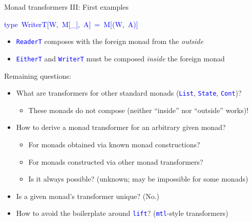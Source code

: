 \documentclass[english]{beamer}
\newenvironment{lyxcode}
  {\par\begin{list}{}{
    \setlength{\rightmargin}{\leftmargin}
    \setlength{\listparindent}{0pt}%
    \raggedright
    \setlength{\itemsep}{0pt}
    \setlength{\parsep}{0pt}
    \normalfont\ttfamily}%
   \def\{{\char`\{}
   \def\}{\char`\}}
   \def\textasciitilde{\char`\~}
   \item[]}
  {\end{list}}
\begin{document}
\begin{frame}{Monad transformers III: First examples}
\begin{lyxcode}
\textcolor{blue}{\footnotesize{}type~WriterT{[}W,~M{[}\_{]},~A{]}~=~M{[}(W,~A){]}}{\footnotesize\par}
\end{lyxcode}
\begin{itemize}
\item {\footnotesize{}\vspace{-0.2cm}}\texttt{\textcolor{blue}{\footnotesize{}ReaderT}}
composes with the foreign monad from the \emph{outside}
\item \texttt{\textcolor{blue}{\footnotesize{}EitherT}} and \texttt{\textcolor{blue}{\footnotesize{}WriterT}}
must be composed \emph{inside} the foreign monad
\end{itemize}
{\footnotesize{}\vspace{-0.1cm}}Remaining questions:
\begin{itemize}
\item What are transformers for other standard monads (\texttt{\textcolor{blue}{\footnotesize{}List}},
\texttt{\textcolor{blue}{\footnotesize{}State}}, \texttt{\textcolor{blue}{\footnotesize{}Cont}})?
\begin{itemize}
\item These monads do not compose (neither ``inside'' nor ``outside''
works)!
\end{itemize}
\item How to derive a monad transformer for an arbitrary given monad?
\begin{itemize}
\item For monads obtained via known monad constructions?
\item For monads constructed via other monad transformers?
\item Is it always possible? (unknown; may be impossible for some monads)
\end{itemize}
\item Is a given monad's transformer unique? (No.)
\item How to avoid the boilerplate around \texttt{\textcolor{blue}{\footnotesize{}lift}}?
(\texttt{\textcolor{blue}{\footnotesize{}mtl}}-style transformers)
\end{itemize}
\end{frame}
\end{document}
